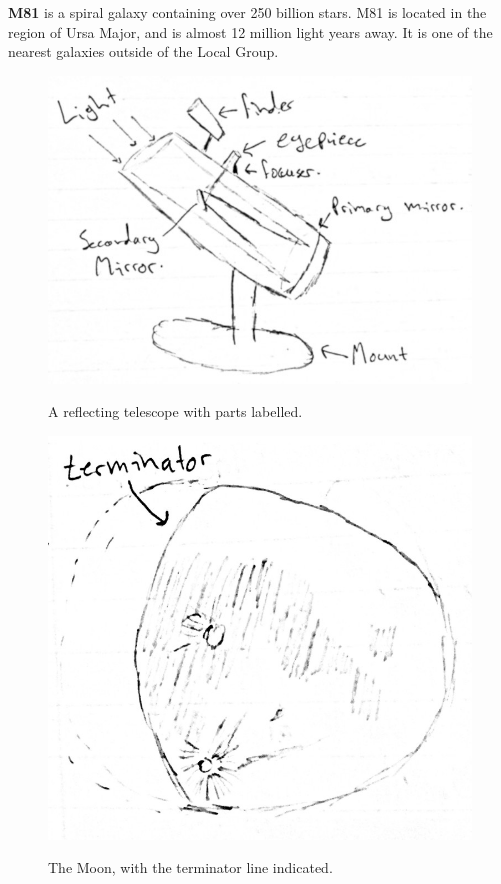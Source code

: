 \documentclass[11pt]{article}
\begin{document}
\textbf{M81} is a spiral galaxy containing over 250 billion stars.
M81 is located in the region of Ursa Major, and is almost 12 million light years away.
It is one of the nearest galaxies outside of the Local Group.
\cite{messier81}


\begin{figure}[H]
\caption{A reflecting telescope with parts labelled.}
\begin{center}
\includegraphics[scale=0.8]{figures/telescope.jpg}
\label{fig:telescope}
\end{center}
\end{figure}

\begin{figure}[H]
\caption{The Moon, with the terminator line indicated.}
\begin{center}
\includegraphics[scale=0.5]{figures/moon.jpg}
\label{fig:moon}
\end{center}
\end{figure}
\end{document}
